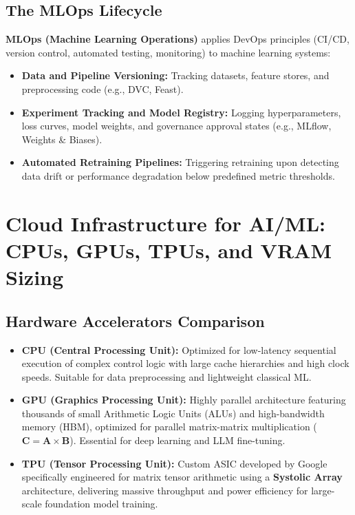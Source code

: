 \subsection{The MLOps Lifecycle}
\textbf{MLOps (Machine Learning Operations)} applies DevOps principles (CI/CD, version control, automated testing, monitoring) to machine learning systems:
\begin{itemize}
    \item \textbf{Data and Pipeline Versioning:} Tracking datasets, feature stores, and preprocessing code (e.g., DVC, Feast).
    \item \textbf{Experiment Tracking and Model Registry:} Logging hyperparameters, loss curves, model weights, and governance approval states (e.g., MLflow, Weights \& Biases).
    \item \textbf{Automated Retraining Pipelines:} Triggering retraining upon detecting data drift or performance degradation below predefined metric thresholds.
\end{itemize}


\section{Cloud Infrastructure for AI/ML: CPUs, GPUs, TPUs, and VRAM Sizing}
\label{sec:cloud_ai_hardware}

\subsection{Hardware Accelerators Comparison}
\begin{itemize}
    \item \textbf{CPU (Central Processing Unit):} Optimized for low-latency sequential execution of complex control logic with large cache hierarchies and high clock speeds. Suitable for data preprocessing and lightweight classical ML.
    \item \textbf{GPU (Graphics Processing Unit):} Highly parallel architecture featuring thousands of small Arithmetic Logic Units (ALUs) and high-bandwidth memory (HBM), optimized for parallel matrix-matrix multiplication ($\mathbf{C} = \mathbf{A} \times \mathbf{B}$). Essential for deep learning and LLM fine-tuning.
    \item \textbf{TPU (Tensor Processing Unit):} Custom ASIC developed by Google specifically engineered for matrix tensor arithmetic using a \textbf{Systolic Array} architecture, delivering massive throughput and power efficiency for large-scale foundation model training.
\end{itemize}

